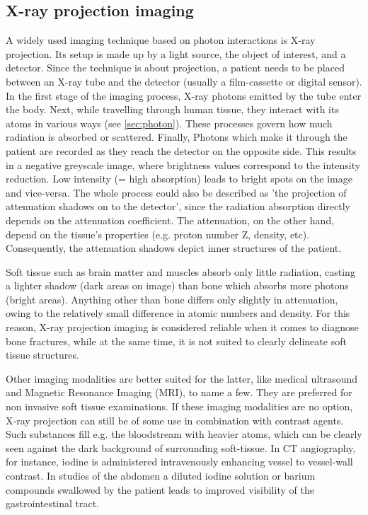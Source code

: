 \subsection{X-ray projection imaging}
A widely used imaging technique based on photon interactions is X-ray projection.
Its setup is made up by a light source, the object of interest, and a detector.
Since the technique is about projection, a patient needs to be placed between an X-ray tube and the detector (usually a film-cassette or digital sensor).
In the first stage of the imaging process, X-ray photons emitted by the tube enter the body.
Next, while travelling through human tissue, they interact with its atoms in various ways (see \ref{sec:photon}).
These processes govern how much radiation is absorbed or scattered.
Finally, Photons which make it through the patient are recorded as they reach the detector on the opposite side.
This results in a negative greyscale image, where brightness values correspond to the intensity reduction.
Low intensity (= high absorption) leads to bright spots on the image and vice-versa.
The whole process could also be described as 'the projection of attenuation shadows on to the detector', since the radiation absorption directly depends on the attenuation coefficient. The attenuation, on the other hand, depend on the tissue's properties (e.g. proton number Z, density, etc).
Consequently, the attenuation shadows depict inner structures of the patient.

Soft tissue such as brain matter and muscles absorb only little radiation, casting a lighter shadow (dark areas on image) than bone which absorbs more photons (bright areas).
Anything other than bone differs only slightly in attenuation, owing to the relatively small difference in atomic numbers and density.
For this reason, X-ray projection imaging is considered reliable when it comes to diagnose bone fractures, while at the same time, it is not suited to clearly delineate soft tissue structures.
 
Other imaging modalities are better suited for the latter, like medical ultrasound and Magnetic Resonance Imaging (MRI), to name a few.
They are preferred for non invasive soft tissue examinations.
If these imaging modalities are no option, X-ray projection can still be of some use in combination with contrast agents.
Such substances fill e.g. the bloodstream with heavier atoms, which can be clearly seen against the dark background of surrounding soft-tissue.
In CT angiography, for instance, iodine is administered intravenously enhancing vessel to vessel-wall contrast.
In studies of the abdomen a diluted iodine solution or barium compounds swallowed by the patient leads to improved visibility of the gastrointestinal tract.

